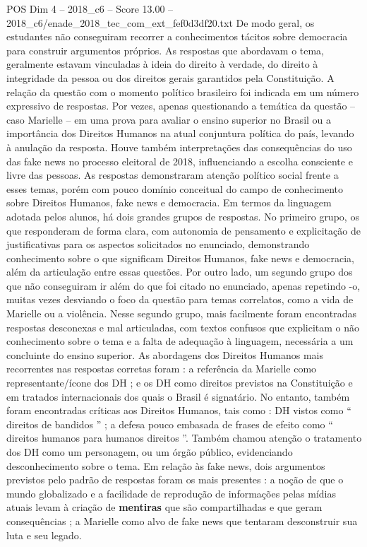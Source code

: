 \begin{textsample}{POS Dim 4 – 2018\_c6 – Score 13.00 – 2018\_c6/enade\_2018\_tec\_com\_ext\_fef0d3df20.txt}
De modo geral, os estudantes não conseguiram recorrer a conhecimentos tácitos sobre democracia para construir argumentos próprios.
As respostas que abordavam o tema, geralmente estavam vinculadas à ideia do direito à verdade, do direito à integridade da pessoa ou dos direitos gerais garantidos pela Constituição.
A relação da questão com o momento político brasileiro foi indicada em um número expressivo de respostas.
Por vezes, apenas questionando a temática da questão – caso Marielle – em uma prova para avaliar o ensino superior no Brasil ou a importância dos Direitos Humanos na atual conjuntura política do país, levando à anulação da resposta.
Houve também interpretações das consequências do uso das fake news no processo eleitoral de 2018, influenciando a escolha consciente e livre das pessoas.
As respostas demonstraram atenção político social frente a esses temas, porém com pouco domínio conceitual do campo de conhecimento sobre Direitos Humanos, fake news e democracia.
Em termos da linguagem adotada pelos alunos, há dois grandes grupos de respostas.
No primeiro grupo, os que responderam de forma clara, com autonomia de pensamento e explicitação de justificativas para os aspectos solicitados no enunciado, demonstrando conhecimento sobre o que significam Direitos Humanos, fake news e democracia, além da articulação entre essas questões.
Por outro lado, um segundo grupo dos que não conseguiram ir além do que foi citado no enunciado, apenas repetindo -o, muitas vezes desviando o foco da questão para temas correlatos, como a vida de Marielle ou a violência.
Nesse segundo grupo, mais facilmente foram encontradas respostas desconexas e mal articuladas, com textos confusos que explicitam o não conhecimento sobre o tema e a falta de adequação à linguagem, necessária a um concluinte do ensino superior.
As abordagens dos Direitos Humanos mais recorrentes nas respostas corretas foram : a referência da Marielle como representante/ícone dos DH ; e os DH como direitos previstos na Constituição e em tratados internacionais dos quais o Brasil é signatário.
No entanto, também foram encontradas críticas aos Direitos Humanos, tais como : DH vistos como “ direitos de bandidos ” ; a defesa pouco embasada de frases de efeito como “ direitos humanos para humanos direitos ”.
Também chamou atenção o tratamento dos DH como um personagem, ou um órgão público, evidenciando desconhecimento sobre o tema.
Em relação às fake news, dois argumentos previstos pelo padrão de respostas foram os mais presentes : a noção de que o mundo globalizado e a facilidade de reprodução de informações pelas mídias atuais levam à criação de \textbf{mentiras} que são compartilhadas e que geram consequências ; a Marielle como alvo de fake news que tentaram desconstruir sua luta e seu legado.

\end{textsample}
